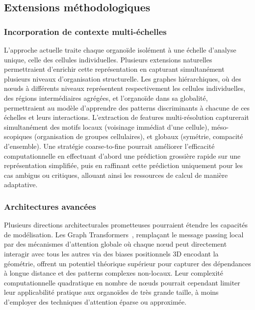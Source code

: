 \subsection{Extensions méthodologiques}

\subsubsection{Incorporation de contexte multi-échelles}

L'approche actuelle traite chaque organoïde isolément à une échelle d'analyse unique, celle des cellules individuelles. Plusieurs extensions naturelles permettraient d'enrichir cette représentation en capturant simultanément plusieurs niveaux d'organisation structurelle. Les graphes hiérarchiques, où des nœuds à différents niveaux représentent respectivement les cellules individuelles, des régions intermédiaires agrégées, et l'organoïde dans sa globalité, permettraient au modèle d'apprendre des patterns discriminants à chacune de ces échelles et leurs interactions. L'extraction de features multi-résolution capturerait simultanément des motifs locaux (voisinage immédiat d'une cellule), méso-scopiques (organisation de groupes cellulaires), et globaux (symétrie, compacité d'ensemble). Une stratégie coarse-to-fine pourrait améliorer l'efficacité computationnelle en effectuant d'abord une prédiction grossière rapide sur une représentation simplifiée, puis en raffinant cette prédiction uniquement pour les cas ambigus ou critiques, allouant ainsi les ressources de calcul de manière adaptative.

\subsubsection{Architectures avancées}

Plusieurs directions architecturales prometteuses pourraient étendre les capacités de modélisation. Les Graph Transformers~\cite{Vaswani2017}, remplaçant le message passing local par des mécanismes d'attention globale où chaque nœud peut directement interagir avec tous les autres via des biases positionnels 3D encodant la géométrie, offrent un potentiel théorique supérieur pour capturer des dépendances à longue distance et des patterns complexes non-locaux. Leur complexité computationnelle quadratique en nombre de nœuds pourrait cependant limiter leur applicabilité pratique aux organoïdes de très grande taille, à moins d'employer des techniques d'attention éparse ou approximée.

